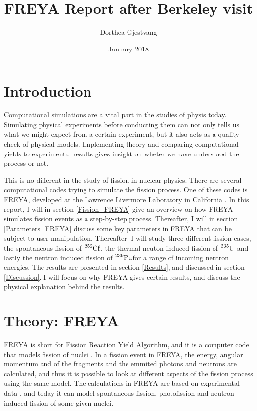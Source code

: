 \documentclass[]{article}
\title{}
\author{}
\begin{document}
	
\title{FREYA Report after Berkeley visit}
\author{Dorthea Gjestvang}
\date{January 2018}

\maketitle

\section{Introduction}
Computational simulations are a vital part in the studies of physis today. Simulating physical experiments before conducting them can not only tells us what we might expect from a certain experiment, but it also acts as a quality check of physical models. Implementing theory and comparing computational yields to experimental results gives insight on wheter we have understood the process or not.\par 
\vspace{3mm}
This is no different in the study of fission in nuclear physics. There are several computational codes trying to simulate the fission process. One of these codes is FREYA, developed at the Lawrence Livermore Laboratory in California \cite{FREYAusemanual}. In this report, I will in section \ref{Fission_FREYA} give an overview on how FREYA simulates fission events as a step-by-step process. Thereafter, I will in section \ref{Parameters_FREYA} discuss some key parameters in FREYA that can be subject to user manipulation. Thereafter, I will study three different fission cases, the spontaneous fission of $\ce{^{252}Cf}$, the thermal neuton induced fission of $\ce{^{235}U}$ and lastly the neutron induced fission of $\ce{^{239}Pu}$for a range of incoming neutron energies. The results are presented in section \ref{Results}, and discussed in section \ref{Discussion}. I will focus on why FREYA gives certain results, and discuss the physical explanation behind the results.

\section{Theory: FREYA}
FREYA is short for Fission Reaction Yield Algorithm, and it is a computer code that models fission of nuclei \cite{FREYAusemanual}. In a fission event in FREYA, the energy, angular momentum and of the fragments and the emmited photons and neutrons are calculated, and thus it is possible to look at different aspects of the fission process using the same model. The calculations in FREYA are based on experimental data \cite{FREYAusemanual}, and today it can model spontaneous fission, photofission and neutron-induced fission of some given nuclei.
\end{document}
